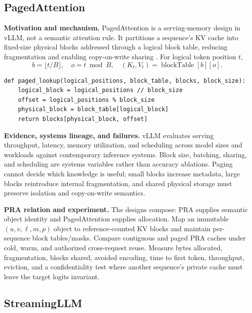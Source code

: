 \subsection{PagedAttention}

\textbf{Motivation and mechanism.} PagedAttention is a serving-memory design in vLLM, not
a semantic attention rule.  It partitions a sequence's KV cache into fixed-size physical
blocks addressed through a logical block table, reducing fragmentation and enabling
copy-on-write sharing \citep{kwon2023vllm}.  For logical token position $t$,
\begin{equation}
b=\lfloor t/B\rfloor,\quad o=t\bmod B,\quad
(K_t,V_t)=\operatorname{blockTable}[b][o].
\end{equation}

\begin{lstlisting}[caption={Logical-to-physical KV lookup}]
def paged_lookup(logical_positions, block_table, blocks, block_size):
    logical_block = logical_positions // block_size
    offset = logical_positions % block_size
    physical_block = block_table[logical_block]
    return blocks[physical_block, offset]
\end{lstlisting}

\textbf{Evidence, systems lineage, and failures.} vLLM evaluates serving throughput,
latency, memory utilization, and scheduling across model sizes and workloads against
contemporary inference systems.  Block size, batching, sharing, and scheduling are systems
variables rather than accuracy ablations.  Paging cannot decide which knowledge is useful;
small blocks increase metadata, large blocks reintroduce internal fragmentation, and shared
physical storage must preserve isolation and copy-on-write semantics.

\textbf{PRA relation and experiment.} The designs compose: PRA supplies semantic object
identity and PagedAttention supplies allocation.  Map an immutable $(u,v,\ell,m,p)$ object
to reference-counted KV blocks and maintain per-sequence block tables/masks.  Compare
contiguous and paged PRA caches under cold, warm, and authorized cross-request reuse.
Measure bytes allocated, fragmentation, blocks shared, avoided encoding, time to first token,
throughput, eviction, and a confidentiality test where another sequence's private cache
must leave the target logits invariant.

\subsection{StreamingLLM}

